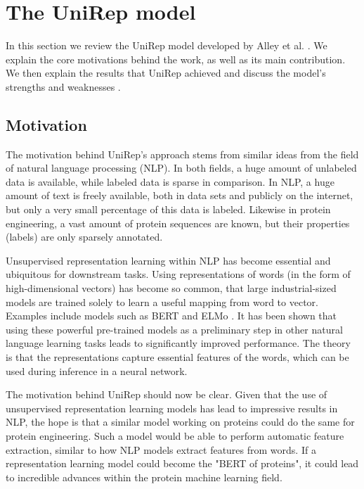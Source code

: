 \documentclass[a4paper,12pt]{article}
\begin{document}
\clearpage
\section{The UniRep model}
In this section we review the UniRep model developed by Alley et al. \cite{alley2019unified}. We explain the core motivations behind the work, as well as its main contribution. We then explain the results that UniRep achieved and discuss the model's strengths and weaknesses .


\subsection{Motivation}
The motivation behind UniRep's approach stems from similar ideas from the field of natural language processing (NLP). In both fields, a huge amount of unlabeled data is available, while labeled data is sparse in comparison. In NLP, a huge amount of text is freely available, both in data sets and publicly on the internet, but only a very small percentage of this data is labeled. Likewise in protein engineering, a vast amount of protein sequences are known, but their properties (labels) are only sparsely annotated.

Unsupervised representation learning within NLP has become essential and ubiquitous for downstream tasks. Using representations of words (in the form of high-dimensional vectors) has become so common, that large industrial-sized models are trained solely to learn a useful mapping from word to vector. Examples include models such as BERT and ELMo . It has been shown that using these powerful pre-trained models as a preliminary step in other natural language learning tasks leads to significantly improved performance. The theory is that the representations capture essential features of the words, which can be used during inference in a neural network.

The motivation behind UniRep should now be clear. Given that the use of unsupervised representation learning models has lead to impressive results in NLP, the hope is that a similar model working on proteins could do the same for protein engineering. Such a model would be able to perform automatic feature extraction, similar to how NLP models extract features from words. If a representation learning model could become the "BERT of proteins", it could lead to incredible advances within the protein machine learning field.
\end{document}
